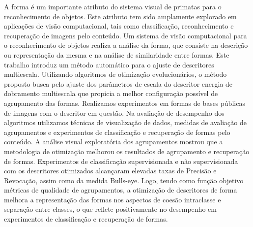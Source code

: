 A forma é um importante atributo do sistema visual de primatas para o reconhecimento de objetos. Este atributo tem sido amplamente explorado em  aplicações de visão computacional, tais como classificação, reconhecimento e recuperação de imagens pelo conteúdo. Um sistema de visão computacional para o reconhecimento de objetos realiza a análise da forma, que consiste na descrição ou representação da mesma e na análise de similaridade entre formas.  Este trabalho introduz um método automático para o ajuste de descritores multiescala. Utilizando algoritmos de otimização evolucionários, o método proposto busca pelo ajuste dos parâmetros de escala do descritor energia de dobramento multiescala que propicia a melhor configuração possível de agrupamento das formas. Realizamos experimentos em formas de bases públicas de imagens com o descritor em questão. Na avaliação de desempenho dos algoritmos utilizamos técnicas de visualização de dados, medidas de avaliação de agrupamentos e experimentos de classificação e recuperação de formas pelo conteúdo. A análise visual exploratória dos agrupamentos mostrou que a metodologia de otimização melhorou os resultados de agrupamento e recuperação de formas. Experimentos de classificação supervisionada e não supervisionada com os descritores otimizados alcançaram elevadas taxas de Precisão e Revocação, assim como da medida Bulls-eye. Logo, tendo como função objetivo métricas de qualidade de agrupamentos, a otimização de descritores de forma melhora a representação das formas nos aspectos de coesão intraclasse e separação entre classes, o que reflete positivamente no desempenho em experimentos de classificação e recuperação de formas.
